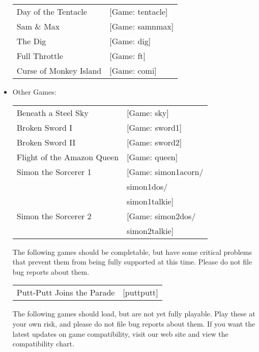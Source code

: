\begin{itemize}
\begin {tabular} [h] {ll}
    Day of the Tentacle&                           [Game: tentacle]\\
    Sam \& Max&                                    [Game: samnmax]\\
    The Dig&                                       [Game: dig]\\
    Full Throttle&                                 [Game: ft]\\
    Curse of Monkey Island&                        [Game: comi]\\
  \end{tabular}
\item Other Games:\\ 
  \begin{tabular}[h]{ll}
     Beneath a Steel Sky&                             [Game: sky]\\
    Broken Sword I&                                [Game: sword1]\\
    Broken Sword II&                               [Game: sword2]\\
    Flight of the Amazon Queen&                    [Game: queen]\\
     Simon the Sorcerer 1&                         [Game: simon1acorn/\\
     &                                                    simon1dos/\\
     &                                                    simon1talkie]\\
     Simon the Sorcerer 2&                         [Game: simon2dos/\\
     &                                                    simon2talkie]\\
  \end{tabular}

The following games should be completable, but have some critical problems that
prevent them from being fully supported at this time. Please do not file bug
reports about them.

  \begin{tabular}[h]{ll}
	Putt-Putt Joins the Parade& [puttputt]\\
  \end{tabular}

  The following games should load, but are not yet fully playable. Play these at your own risk, and please do not file bug reports about them. If you want
the latest updates on game compatibility, visit our web site and view the
compatibility chart.


\end{itemize}
